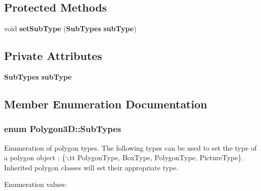 \subsection*{Protected Methods}
\begin{CompactItemize}
\item 
void {\bf set\-Sub\-Type} ({\bf Sub\-Types} {\bf sub\-Type})
\end{CompactItemize}
\subsection*{Private Attributes}
\begin{CompactItemize}
\item 
{\bf Sub\-Types} {\bf sub\-Type}
\end{CompactItemize}


\subsection{Member Enumeration Documentation}
\subsubsection{\setlength{\rightskip}{0pt plus 5cm}enum Polygon3D::Sub\-Types}\label{classPolygon3D_s5}


Enumeration of polygon types. The following types can be used to set the type of a polygon object : \{$\backslash$tt Polygon\-Type, Box\-Type, Polygon\-Type, Picture\-Type\}. Inherited polygon classes will set their appropriate type. \begin{Desc}
\item[Enumeration values: ]\par
\begin{description}
\item[{\em 
{\em Poly\-Line3DType}\label{classPolygon3D_s5s0}
}]\item[{\em 
{\em Box\-Type}\label{classPolygon3D_s5s1}
}]\item[{\em 
{\em Polygon\-Type}\label{classPolygon3D_s5s2}
}]\item[{\em 
{\em Arc\-Box\-Type}\label{classPolygon3D_s5s3}
}]\item[{\em 
{\em Picture\-Type}\label{classPolygon3D_s5s4}
}]\end{description}
\end{Desc}



